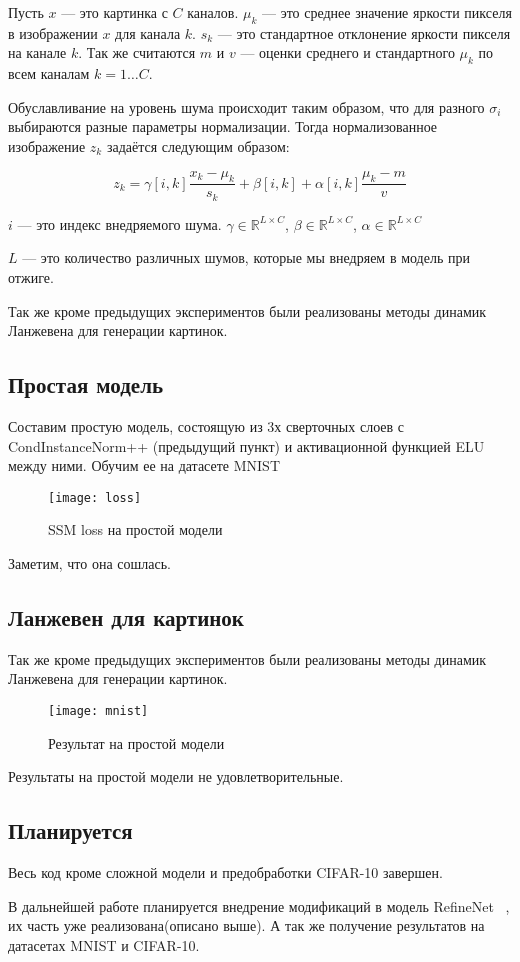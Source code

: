 \documentclass{article}
\begin{document}
Пусть $x$ --- это картинка с $C$ каналов. $\mu_k$ --- это среднее значение яркости пикселя в изображении
$x$ для канала $k$. $s_k$ --- это стандартное отклонение яркости пикселя на канале $k$.
Так же считаются $m$ и $v$ --- оценки среднего и стандартного $\mu_k$ по всем каналам $k=1\ldots C$.

Обуславливание на уровень шума происходит таким образом, что для разного $\sigma_i$ выбираются разные
параметры нормализации. Тогда нормализованное изображение $z_k$ задаётся следующим образом:

\[
z_k = \gamma[i, k] \frac{x_k - \mu_k}{s_k} + \beta[i,k] + \alpha[i,k]\frac{\mu_k - m}{v}
\]

$i$ --- это индекс внедряемого шума.
$\gamma \in \mathbb{R}^{L \times C}$, $\beta \in \mathbb{R}^{L \times C}$, $\alpha \in \mathbb{R}^{L \times C}$

$L$ --- это количество различных шумов, которые мы внедряем в модель при отжиге.

Так же кроме предыдущих экспериментов были реализованы методы динамик Ланжевена для генерации картинок.



\subsection{Простая модель}

Составим простую модель, состоящую из 3х сверточных слоев с CondInstanceNorm++ (предыдущий пункт) и активационной функцией ELU между ними. Обучим ее на датасете MNIST

\begin{figure}[H]
	\centering
	\texttt{[image: loss]}
	\caption{SSM loss на простой модели}
	\label{fig:loss}
\end{figure}

Заметим, что она сошлась.


\subsection{Ланжевен для картинок}

Так же кроме предыдущих экспериментов были реализованы методы динамик Ланжевена для генерации картинок. 

\begin{figure}[H]
	\centering
	\texttt{[image: mnist]}
	\caption{Результат на простой модели}
	\label{fig:mnist}
\end{figure}

Результаты на простой модели не удовлетворительные. 

\subsection{Планируется}

Весь код кроме сложной модели и предобработки CIFAR-10 завершен.

В дальнейшей работе планируется внедрение модификаций в модель RefineNet ~\cite{DBLP:journals/corr/LinMS016}, их часть уже реализована(описано выше).  А так же получение результатов на датасетах MNIST и CIFAR-10.


 
 
\end{document}
